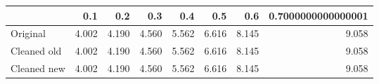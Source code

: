 \begin{tabular}{lrrrrrrr}
\toprule
{} &   0.1 &   0.2 &   0.3 &   0.4 &   0.5 &   0.6 & 0.7000000000000001 \\
\midrule
Original    & 4.002 & 4.190 & 4.560 & 5.562 & 6.616 & 8.145 &              9.058 \\
Cleaned old & 4.002 & 4.190 & 4.560 & 5.562 & 6.616 & 8.145 &              9.058 \\
Cleaned new & 4.002 & 4.190 & 4.560 & 5.562 & 6.616 & 8.145 &              9.058 \\
\bottomrule
\end{tabular}
